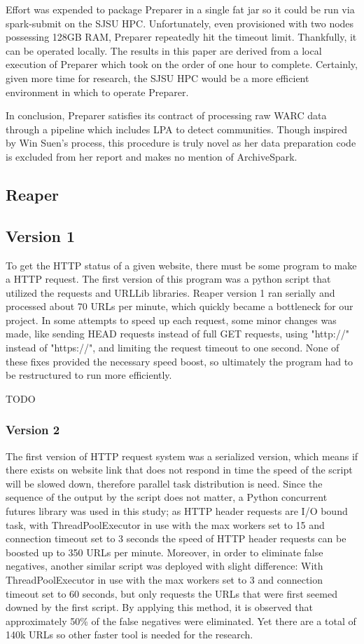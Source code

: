 \documentclass[conference]{IEEEtran}
\begin{document}
Effort was expended to package Preparer in a single fat jar so it could be run via spark-submit on the SJSU HPC. Unfortunately, even provisioned with two nodes possessing 128GB RAM, Preparer repeatedly hit the timeout limit. Thankfully, it can be operated locally. The results in this paper are derived from a local execution of Preparer which took on the order of one hour to complete. Certainly, given more time for research, the SJSU HPC would be a more efficient environment in which to operate Preparer.

In conclusion, Preparer satisfies its contract of processing raw WARC data through a pipeline which includes LPA to detect communities. Though inspired by Win Suen's process, this procedure is truly novel as her data preparation code is excluded from her report and makes no mention of ArchiveSpark.

\subsection{Reaper}
\subsection{Version 1}
To get the HTTP status of a given website, there must be some program to make a HTTP request. The first version of this program was a python script that utilized the requests and URLLib libraries. Reaper version 1 ran serially and processed about 70 URLs per minute, which quickly became a bottleneck for our project. In some attempts to speed up each request, some minor changes was made, like sending HEAD requests instead of full GET requests, using "http://" instead of "https://", and limiting the request timeout to one second. None of these fixes provided the necessary speed boost, so ultimately the program had to be restructured to run more efficiently.

TODO
\subsubsection{Version 2}
The first version of HTTP request system was a serialized version, 
which means if there exists on website link that does not respond in time the speed of the script will be slowed down, 
therefore parallel task distribution is need. 
Since the sequence of the output by the script does not matter, 
a Python concurrent futures library was used in this study; 
as HTTP header requests are I/O bound task, 
with ThreadPoolExecutor in use with the max workers set to 15 and connection timeout set to 3 seconds the speed of HTTP header requests can be boosted up to 350 URLs per minute.
 Moreover, in order to eliminate false negatives, 
another similar script was deployed with slight difference: 
With ThreadPoolExecutor in use with the max workers set to 3 and connection timeout set to 60 seconds, but only requests the URLs that were first seemed downed by the first script. By applying this method, 
it is observed that approximately 50\% of the false negatives were eliminated. 
Yet there are a total of 140k URLs so other faster tool is needed for the research.
\end{document}

